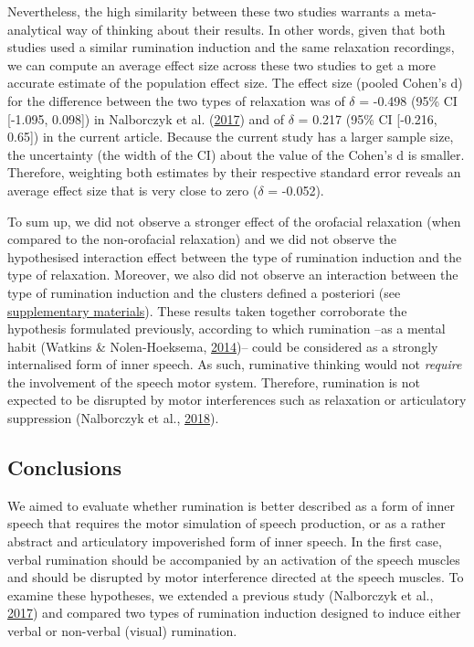 \documentclass[a4paper,12pt,twoside,onecolumn,openright,final,oldfontcommands]{memoir}
\begin{document}
Nevertheless, the high similarity between these two studies warrants a meta-analytical way of thinking about their results. In other words, given that both studies used a similar rumination induction and the same relaxation recordings, we can compute an average effect size across these two studies to get a more accurate estimate of the population effect size. The effect size (pooled Cohen's d) for the difference between the two types of relaxation was of \(\delta\) = -0.498 (95\% CI {[}-1.095, 0.098{]}) in Nalborczyk et al. (\protect\hyperlink{ref-nalborczyk_orofacial_2017}{2017}) and of \(\delta\) = 0.217 (95\% CI {[}-0.216, 0.65{]}) in the current article. Because the current study has a larger sample size, the uncertainty (the width of the CI) about the value of the Cohen's d is smaller. Therefore, weighting both estimates by their respective standard error reveals an average effect size that is very close to zero (\(\delta\) = -0.052).

To sum up, we did not observe a stronger effect of the orofacial relaxation (when compared to the non-orofacial relaxation) and we did not observe the hypothesised interaction effect between the type of rumination induction and the type of relaxation. Moreover, we also did not observe an interaction between the type of rumination induction and the clusters defined a posteriori (see \protect\hyperlink{suppCh4}{supplementary materials}). These results taken together corroborate the hypothesis formulated previously, according to which rumination --as a mental habit (Watkins \& Nolen-Hoeksema, \protect\hyperlink{ref-watkins_habit-goal_2014}{2014})-- could be considered as a strongly internalised form of inner speech. As such, ruminative thinking would not \emph{require} the involvement of the speech motor system. Therefore, rumination is not expected to be disrupted by motor interferences such as relaxation or articulatory suppression (Nalborczyk et al., \protect\hyperlink{ref-nalborczyk_articulatory_2018}{2018}).

\hypertarget{conclusions}{%
\subsection{Conclusions}\label{conclusions}}

We aimed to evaluate whether rumination is better described as a form of inner speech that requires the motor simulation of speech production, or as a rather abstract and articulatory impoverished form of inner speech. In the first case, verbal rumination should be accompanied by an activation of the speech muscles and should be disrupted by motor interference directed at the speech muscles. To examine these hypotheses, we extended a previous study (Nalborczyk et al., \protect\hyperlink{ref-nalborczyk_orofacial_2017}{2017}) and compared two types of rumination induction designed to induce either verbal or non-verbal (visual) rumination.
\end{document}
